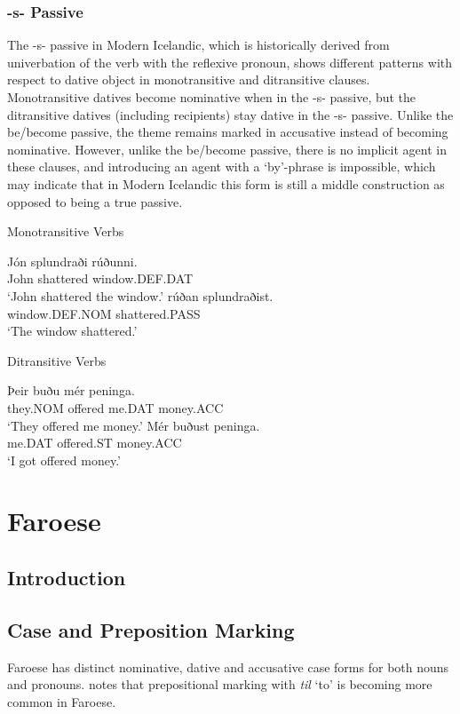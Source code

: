 \subsubsection{-s- Passive}
The -s- passive in Modern Icelandic, which is historically derived from univerbation of the verb with the reflexive pronoun, shows different patterns with respect to dative object in monotransitive and ditransitive clauses. Monotransitive datives become nominative when in the -s- passive, but the ditransitive datives (including recipients) stay dative in the -s- passive. Unlike the be/become passive, the theme remains marked in accusative instead of becoming nominative. However, unlike the be/become passive, there is no implicit agent in these clauses, and introducing an agent with a `by'-phrase is impossible, which may indicate that in Modern Icelandic this form is still a middle construction as opposed to being a true passive.
\begin{exe}
\ex Monotransitive Verbs
\begin{xlist}
\ex \gll Jón splundraði rúðunni.\\
John shattered window.DEF.DAT\\
\trans `John shattered the window.'
\ex \gll rúðan splundraðist.\\
window.DEF.NOM shattered.PASS\\
\trans `The window shattered.'
\end{xlist}
\ex Ditransitive Verbs
\begin{xlist}
\ex \gll Þeir buðu mér peninga.\\
they.NOM offered me.DAT money.ACC\\
\trans `They offered me money.'
\ex \gll Mér buðust peninga.\\
me.DAT offered.ST money.ACC\\
\trans `I got offered money.'
\end{xlist}
\end{exe}

\section{Faroese}\label{sec:Faroese}



\subsection{Introduction}
\subsection{Case and Preposition Marking}
Faroese has distinct nominative, dative and accusative case forms for both nouns and pronouns. \cite{Lundquist.2013b} notes that prepositional marking with \emph{til} `to' is becoming more common in Faroese.

